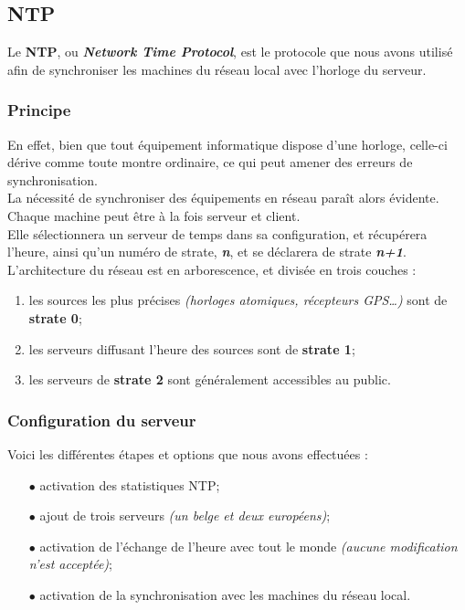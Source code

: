 \subsection{NTP}
\label{subsec:ntp}

Le \textbf{NTP}, ou \textit{\textbf{Network Time Protocol}}, est le protocole que nous
avons utilisé afin de synchroniser les machines du réseau local avec l'horloge
du serveur.


\subsubsection{Principe}
\label{subsubsec:principe}

En effet, bien que tout équipement informatique dispose d'une horloge, celle-ci
dérive comme toute montre ordinaire, ce qui peut amener des erreurs de
synchronisation. \\
La nécessité de synchroniser des équipements en réseau paraît alors évidente. \\

Chaque machine peut être à la fois serveur et client.\\
Elle sélectionnera un serveur de temps dans sa configuration, et récupérera
l'heure, ainsi qu'un numéro de strate, \textit{\textbf{n}}, et se déclarera
de strate \textit{\textbf{n+1}}.\\

L'architecture du réseau est en arborescence, et divisée en trois couches :
\begin{enumerate}

    \item les sources les plus précises \textit{(horloges atomiques,
    récepteurs GPS…)} sont de \textbf{strate 0};
    \item les serveurs diffusant l'heure des sources sont de \textbf{strate 1};
    \item les serveurs de \textbf{strate 2} sont généralement accessibles au public.

\end{enumerate}


\subsubsection{Configuration du serveur}
\label{subsubsec:configuration-serveur}

Voici les différentes étapes et options que nous avons effectuées :
\begin{itemize}

    \item[$\bullet$] activation des statistiques NTP;
    \item[$\bullet$] ajout de trois serveurs \textit{(un belge et deux européens)};
    \item[$\bullet$] activation de l'échange de l'heure avec tout le monde
    \textit{(aucune modification n'est acceptée)};
    \item[$\bullet$] activation de la synchronisation avec les machines du
    réseau local.

\end{itemize}


